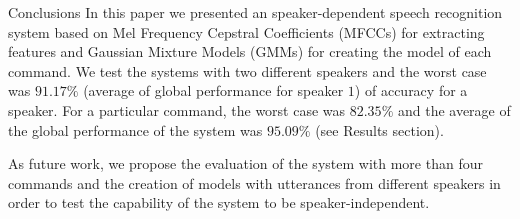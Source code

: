 \documentclass[final]{beamer}
\begin{document}
\begin{frame}{}
\begin{textblock}{39.5}
\begin{block}{Conclusions}
In this paper we presented an speaker-dependent speech recognition system based on Mel Frequency Cepstral Coefficients (MFCCs) for extracting features and Gaussian Mixture Models (GMMs) for creating the model of each command. We test the systems with two different speakers and the worst case was $91.17\%$ (average of global performance for speaker $1$) of accuracy for a speaker. For a particular command, the worst case was $82.35\%$ and the average of the global performance of the system was $95.09\%$ (see Results section).

As future work, we propose the evaluation of the system with more than four commands and the creation of models with utterances from different speakers in order to test the capability of the system to be speaker-independent.
\end{block}
\end{textblock}

\end{frame}
\end{document}
